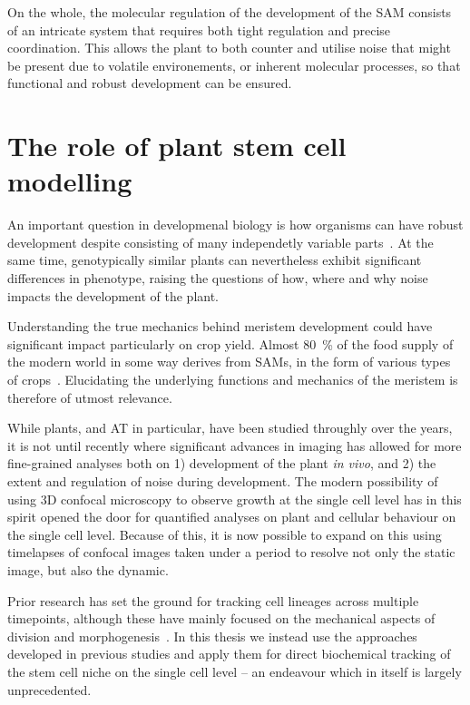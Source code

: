 On the whole, the molecular regulation of the
development of the SAM consists of an intricate system that requires both tight
regulation and precise coordination. This allows the plant to both counter and 
utilise noise that might be present due to volatile environements, or inherent
molecular processes, so that functional and robust development can be ensured.

\section{The role of plant stem cell modelling}
An important question in developmenal biology is how organisms can have robust
development despite consisting of many independetly variable
parts~\cite{mirabet2012noise,ciliberti2007robustness,lempe2013molecular}.
At the same time, genotypically similar plants can nevertheless exhibit
significant differences in phenotype, raising the questions of how, where and
why noise impacts the development of the plant. 

Understanding the true mechanics behind meristem development could have
significant impact particularly on crop yield. Almost 80~\% of the food supply
of the modern world in some way derives from SAMs, in the form of various types
of crops~\cite{eightyperc}. Elucidating the underlying functions and mechanics of the
meristem is therefore of utmost relevance.

While plants, and AT in particular, have been studied throughly over the years,
it is not until recently where significant advances in imaging has allowed for
more fine-grained analyses both on 1) development of the plant \textit{in vivo},
and 2) the extent and regulation of noise during development. The modern
possibility of using 3D confocal microscopy to observe growth at the
single cell level has in this spirit opened the door for quantified analyses on
plant and cellular behaviour on the single cell level. Because of this, it is now
possible to expand on this using timelapses of confocal images taken under a
period to resolve not only the static image, but also the dynamic. 

Prior research has set the ground for tracking cell lineages across multiple
timepoints, although these have mainly focused on the mechanical aspects of
division and morphogenesis~\cite{willis2016cell}. In this thesis we instead use the
approaches developed in previous studies and apply them for direct biochemical
tracking of the stem cell niche on the single cell level -- an endeavour which
in itself is largely unprecedented. 

